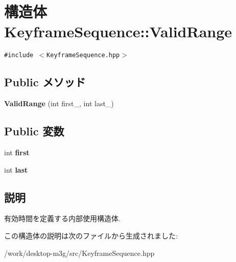 \hypertarget{structm3g_1_1KeyframeSequence_1_1ValidRange}{
\section{構造体 KeyframeSequence::ValidRange}
\label{structm3g_1_1KeyframeSequence_1_1ValidRange}
}
{\tt \#include $<$KeyframeSequence.hpp$>$}

\subsection*{Public メソッド}
\begin{CompactItemize}
\item 
\hypertarget{structm3g_1_1KeyframeSequence_1_1ValidRange_d9ada86c9bba00101977e5f3f456b9ce}{
\textbf{ValidRange} (int first\_\-, int last\_\-)}
\label{structm3g_1_1KeyframeSequence_1_1ValidRange_d9ada86c9bba00101977e5f3f456b9ce}

\end{CompactItemize}
\subsection*{Public 変数}
\begin{CompactItemize}
\item 
\hypertarget{structm3g_1_1KeyframeSequence_1_1ValidRange_6c8ec3c3e77241328358d43697f6f840}{
int \textbf{first}}
\label{structm3g_1_1KeyframeSequence_1_1ValidRange_6c8ec3c3e77241328358d43697f6f840}

\item 
\hypertarget{structm3g_1_1KeyframeSequence_1_1ValidRange_72e27dee31b1c4c6a504fbed29542d97}{
int \textbf{last}}
\label{structm3g_1_1KeyframeSequence_1_1ValidRange_72e27dee31b1c4c6a504fbed29542d97}

\end{CompactItemize}


\subsection{説明}
有効時間を定義する内部使用構造体. 

この構造体の説明は次のファイルから生成されました:\begin{CompactItemize}
\item 
/work/desktop-m3g/src/KeyframeSequence.hpp\end{CompactItemize}
